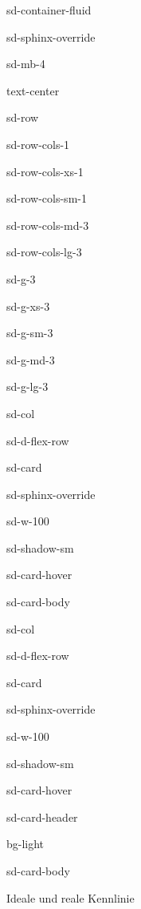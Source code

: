 \documentclass[letterpaper,10pt,english]{jupyterBook}
\let\sphinxpxdimen\pdfpxdimen\else\newdimen\sphinxpxdimen
\begin{document}
\begin{sphinxuseclass}{sd-container-fluid}
\begin{sphinxuseclass}{sd-sphinx-override}
\begin{sphinxuseclass}{sd-mb-4}
\begin{sphinxuseclass}{text-center}
\begin{sphinxuseclass}{sd-row}
\begin{sphinxuseclass}{sd-row-cols-1}
\begin{sphinxuseclass}{sd-row-cols-xs-1}
\begin{sphinxuseclass}{sd-row-cols-sm-1}
\begin{sphinxuseclass}{sd-row-cols-md-3}
\begin{sphinxuseclass}{sd-row-cols-lg-3}
\begin{sphinxuseclass}{sd-g-3}
\begin{sphinxuseclass}{sd-g-xs-3}
\begin{sphinxuseclass}{sd-g-sm-3}
\begin{sphinxuseclass}{sd-g-md-3}
\begin{sphinxuseclass}{sd-g-lg-3}
\begin{sphinxuseclass}{sd-col}
\begin{sphinxuseclass}{sd-d-flex-row}
\begin{sphinxuseclass}{sd-card}
\begin{sphinxuseclass}{sd-sphinx-override}
\begin{sphinxuseclass}{sd-w-100}
\begin{sphinxuseclass}{sd-shadow-sm}
\begin{sphinxuseclass}{sd-card-hover}
\begin{sphinxuseclass}{sd-card-body}
\end{sphinxuseclass}{\hyperref[\detokenize{content/1_Kurvenanpassung::doc}]{}}
\end{sphinxuseclass}
\end{sphinxuseclass}
\end{sphinxuseclass}
\end{sphinxuseclass}
\end{sphinxuseclass}
\end{sphinxuseclass}
\end{sphinxuseclass}
\begin{sphinxuseclass}{sd-col}
\begin{sphinxuseclass}{sd-d-flex-row}
\begin{sphinxuseclass}{sd-card}
\begin{sphinxuseclass}{sd-sphinx-override}
\begin{sphinxuseclass}{sd-w-100}
\begin{sphinxuseclass}{sd-shadow-sm}
\begin{sphinxuseclass}{sd-card-hover}
\begin{sphinxuseclass}{sd-card-header}
\begin{sphinxuseclass}{bg-light}
\sphinxAtStartPar
{}

\end{sphinxuseclass}
\end{sphinxuseclass}
\begin{sphinxuseclass}{sd-card-body}
\noindent\sphinxincludegraphics[height=120\sphinxpxdimen]{{realeKennlinie}.png}

\sphinxAtStartPar
Ideale und reale Kennlinie


\end{sphinxuseclass}
\end{sphinxuseclass}
\end{sphinxuseclass}
\end{sphinxuseclass}
\end{sphinxuseclass}
\end{sphinxuseclass}
\end{sphinxuseclass}
\end{sphinxuseclass}
\end{sphinxuseclass}
\end{sphinxuseclass}
\end{sphinxuseclass}
\end{sphinxuseclass}
\end{sphinxuseclass}
\end{sphinxuseclass}
\end{sphinxuseclass}
\end{sphinxuseclass}
\end{sphinxuseclass}
\end{sphinxuseclass}
\end{sphinxuseclass}
\end{sphinxuseclass}
\end{sphinxuseclass}
\end{sphinxuseclass}
\end{sphinxuseclass}
\end{document}
